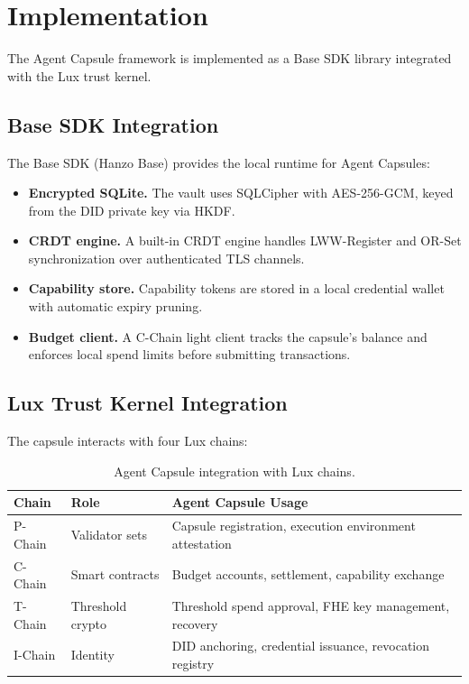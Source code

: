 \documentclass[11pt,a4paper]{article}
\begin{document}
\section{Implementation}\label{sec:implementation}

The Agent Capsule framework is implemented as a Base SDK library integrated with the Lux trust kernel.

\subsection{Base SDK Integration}

The Base SDK (Hanzo Base) provides the local runtime for Agent Capsules:

\begin{itemize}
    \item \textbf{Encrypted SQLite.} The vault uses SQLCipher with AES-256-GCM, keyed from the DID private key via HKDF.
    \item \textbf{CRDT engine.} A built-in CRDT engine handles LWW-Register and OR-Set synchronization over authenticated TLS channels.
    \item \textbf{Capability store.} Capability tokens are stored in a local credential wallet with automatic expiry pruning.
    \item \textbf{Budget client.} A C-Chain light client tracks the capsule's balance and enforces local spend limits before submitting transactions.
\end{itemize}

\subsection{Lux Trust Kernel Integration}

The capsule interacts with four Lux chains:

\begin{table}[H]
\centering
\caption{Agent Capsule integration with Lux chains.}
\label{tab:chains}
\begin{tabular}{llp{6.5cm}}
\toprule
\textbf{Chain} & \textbf{Role} & \textbf{Agent Capsule Usage} \\
\midrule
P-Chain & Validator sets & Capsule registration, execution environment attestation \\
C-Chain & Smart contracts & Budget accounts, settlement, capability exchange \\
T-Chain & Threshold crypto & Threshold spend approval, FHE key management, recovery \\
I-Chain & Identity & DID anchoring, credential issuance, revocation registry \\
\bottomrule
\end{tabular}
\end{table}
\end{document}
